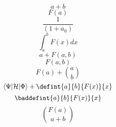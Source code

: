 \documentclass{article}
\begin{document}
\[ a+b \]
\[ F(a) \]
\[ \frac{1}{(1+a_0)} \]
\[ \int_a^b F(x) dx \]
\[ a+F(a,b) \]
\[ F(a,b) \]
\[ F(a) + \binom{a}{b} \]
\[ \left\langle\Psi\middle|\mathcal{H}\middle|\Phi\right\rangle 
  +  \defint{a}{b}{F(x)}{x} \]
\[ \baddefint{a}{b}{F(x)}{x} \]
\[ \binom{F(a)}{a+b} \]
\end{document}
